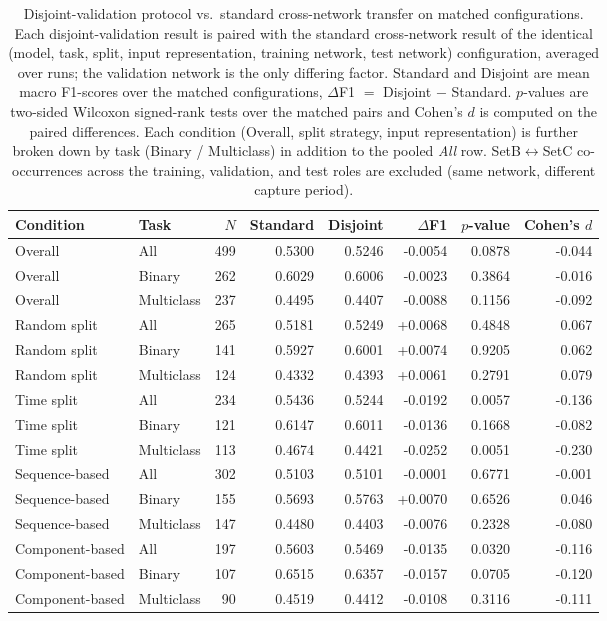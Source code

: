 \begin{table}
\caption{Disjoint-validation protocol vs.\ standard cross-network transfer on matched configurations. Each disjoint-validation result is paired with the standard cross-network result of the identical (model, task, split, input representation, training network, test network) configuration, averaged over runs; the validation network is the only differing factor. Standard and Disjoint are mean macro F1-scores over the matched configurations, $\Delta$F1 $=$ Disjoint $-$ Standard. $p$-values are two-sided Wilcoxon signed-rank tests over the matched pairs and Cohen's $d$ is computed on the paired differences. Each condition (Overall, split strategy, input representation) is further broken down by task (Binary / Multiclass) in addition to the pooled \emph{All} row. SetB$\leftrightarrow$SetC co-occurrences across the training, validation, and test roles are excluded (same network, different capture period).}
\label{tab:q5_overall}
\centering
\small
\begin{tabular}{llrrrrrr}
\toprule
Condition & Task & $N$ & Standard & Disjoint & $\Delta$F1 & $p$-value & Cohen's $d$ \\
\midrule
Overall & All & 499 & 0.5300 & 0.5246 & -0.0054 & 0.0878 & -0.044 \\
Overall & Binary & 262 & 0.6029 & 0.6006 & -0.0023 & 0.3864 & -0.016 \\
Overall & Multiclass & 237 & 0.4495 & 0.4407 & -0.0088 & 0.1156 & -0.092 \\
Random split & All & 265 & 0.5181 & 0.5249 & +0.0068 & 0.4848 & 0.067 \\
Random split & Binary & 141 & 0.5927 & 0.6001 & +0.0074 & 0.9205 & 0.062 \\
Random split & Multiclass & 124 & 0.4332 & 0.4393 & +0.0061 & 0.2791 & 0.079 \\
Time split & All & 234 & 0.5436 & 0.5244 & -0.0192 & 0.0057 & -0.136 \\
Time split & Binary & 121 & 0.6147 & 0.6011 & -0.0136 & 0.1668 & -0.082 \\
Time split & Multiclass & 113 & 0.4674 & 0.4421 & -0.0252 & 0.0051 & -0.230 \\
Sequence-based & All & 302 & 0.5103 & 0.5101 & -0.0001 & 0.6771 & -0.001 \\
Sequence-based & Binary & 155 & 0.5693 & 0.5763 & +0.0070 & 0.6526 & 0.046 \\
Sequence-based & Multiclass & 147 & 0.4480 & 0.4403 & -0.0076 & 0.2328 & -0.080 \\
Component-based & All & 197 & 0.5603 & 0.5469 & -0.0135 & 0.0320 & -0.116 \\
Component-based & Binary & 107 & 0.6515 & 0.6357 & -0.0157 & 0.0705 & -0.120 \\
Component-based & Multiclass & 90 & 0.4519 & 0.4412 & -0.0108 & 0.3116 & -0.111 \\
\bottomrule
\end{tabular}
\end{table}
